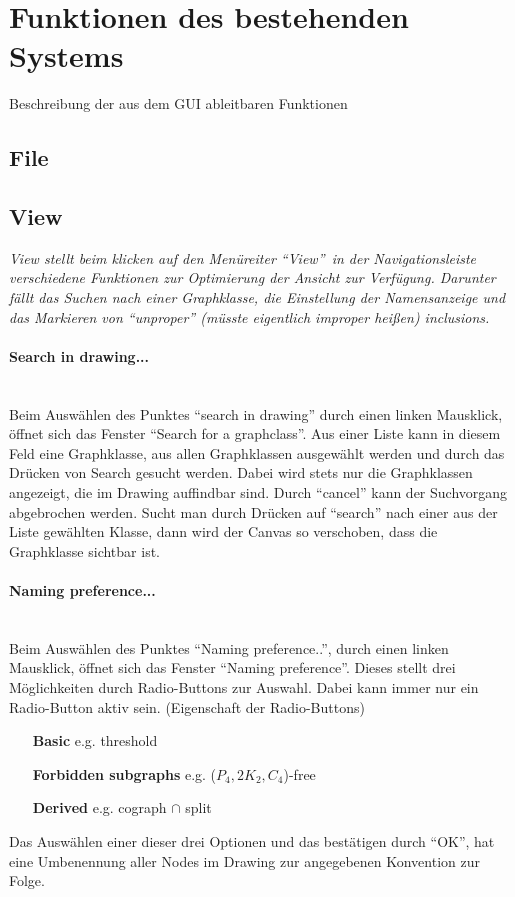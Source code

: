 \documentclass[10pt,a4paper]{article}
\begin{document}
\section{Funktionen des bestehenden Systems}
Beschreibung der aus dem GUI ableitbaren Funktionen
\subsection{File}
\subsection{View}
\emph{View stellt beim klicken auf den Menüreiter "`View"'\ in der Navigationsleiste verschiedene Funktionen zur Optimierung der Ansicht zur Verfügung. Darunter fällt das Suchen nach einer Graphklasse, die Einstellung der Namensanzeige und das Markieren von "`unproper"' (müsste eigentlich improper heißen) inclusions.}\\

\paragraph{Search in drawing...}\ \\
Beim Auswählen des Punktes "`search in drawing"' durch einen linken Mausklick, öffnet sich das Fenster "`Search for a graphclass"'. Aus einer Liste kann in diesem Feld eine Graphklasse, aus allen Graphklassen ausgewählt werden und durch das Drücken von Search gesucht werden. Dabei wird stets nur die Graphklassen angezeigt, die im Drawing auffindbar sind. Durch "`cancel"' kann der Suchvorgang abgebrochen werden. Sucht man durch Drücken auf "`search"' nach einer aus der Liste gewählten Klasse, dann wird der Canvas so verschoben, dass die Graphklasse sichtbar ist.


\paragraph{Naming preference...}\ \\
Beim Auswählen des Punktes "`Naming preference.."', durch einen linken Mausklick, öffnet sich das Fenster "`Naming preference"'. Dieses stellt drei Möglichkeiten durch Radio-Buttons zur Auswahl. Dabei kann immer nur ein Radio-Button aktiv sein. (Eigenschaft der Radio-Buttons) \\
\begin{itemize}
	\item[\bf{Basic}] e.g. threshold
	\item[\bf{Forbidden subgraphs}] e.g. ($P_4,2K_2,C_4$)-free
	\item[\bf{Derived}] e.g. cograph $\cap$ split\\
\end{itemize}
Das Auswählen einer dieser drei Optionen und das bestätigen durch "`OK"', hat eine Umbenennung aller Nodes im Drawing zur angegebenen Konvention zur Folge.
\end{document}
